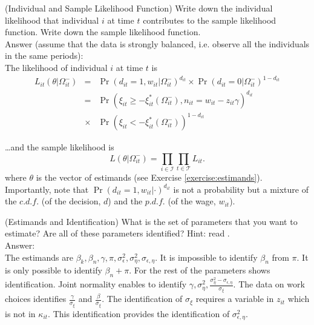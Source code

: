 \begin{exercise} (Individual and Sample Likelihood Function)
Write down the individual likelihood that individual $i$ at time $t$ contributes to the sample likelihood function. Write down the sample likelihood function.\\
\noindent Answer (assume that the data is strongly balanced, i.e. observe all the individuals in the same periods):\\
\noindent The likelihood of individual $i$ at time $t$ is
\begin{eqnarray}
L_{it} \left( \theta | \Omega_{it}^{-} \right) &=& \Pr \left(  d_{it} = 1, w_{it} | \Omega_{it}^{-} \right)^{d_{it}} \times \Pr \left(  d_{it} = 0 | \Omega_{it}^{-} \right)^{1-d_{it}} \nonumber \\
&=& \Pr \left( \xi_{it} \geq - \xi_{it}^{*} \left(\Omega_{it}^{-} \right), n_{it} = w_{it} - z_{it} \gamma  \right) ^{d_{it}} \nonumber \\  
&\times& \Pr \left( \xi_{it} < - \xi_{it}^{*} \left(\Omega_{it}^{-} \right) \right) ^{1 - d_{it}}
\end{eqnarray}

\noindent \ldots and the sample likelihood is
\begin{equation}
L \left( \theta | \Omega_{it}^{-} \right) = \prod \limits _{i \in \mathcal{I}} \prod \limits _{t \in \mathcal{T}} L_{it}.
\end{equation}
\noindent where $\theta$ is the vector of estimands (see Exercise \ref{exercise:estimands}). Importantly, note that $\Pr \left(  d_{it} = 1, w_{it} | \cdot \right)^{d_{it}}$ is not a probability but a mixture of the $c.d.f.$ (of the decision, $d$) and the $p.d.f.$ (of the wage, $w_{it}$).   
\end{exercise}

\begin{exercise} (Estimands and Identification) \label{exercise:estimands}
What is the set of parameters that you want to estimate? Are all of these parameters identified? Hint: read \citet{heckman1979sample}.\\ 
\noindent Answer:\\
\noindent The estimands are $\beta_{k}, \beta_{n}, \gamma, \pi, \sigma_{\epsilon}^2, \sigma_{\eta}^2, \sigma_{\epsilon, \eta} $. It is impossible to identify $\beta_{n}$ from $\pi$. It is only possible to identify $\beta_{n} + \pi$. For the rest of the parameters \citet{heckman1979sample} shows identification. Joint normality enables to identify $\gamma, \sigma_{\eta}^2, \frac{\sigma_{\eta}^2 - \sigma_{\epsilon, \eta}}{\sigma_{\xi}}$. The data on work choices identifies $\frac{\gamma}{\sigma_{\xi}}$ and $\frac{\beta}{\sigma_{\xi}}$. The identification of $\sigma_{\xi}$ requires a variable in $z_{it}$ which is not in $\kappa_{it}$. This identification provides the identification of $\sigma_{\epsilon, \eta}^2$. 
\end{exercise}

